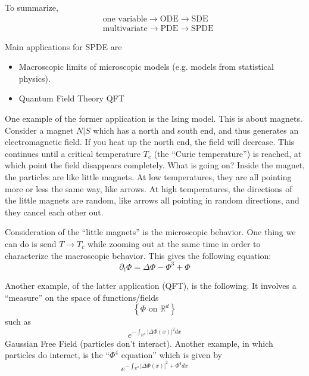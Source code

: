 \documentclass{article}
\def\R{\mathbb{R}} %
\begin{document}
To summarize,
\begin{align*}
  &\text{one variable}\rightarrow \text{ODE}\rightarrow \text{SDE}\\
  &\text{multivariate}\rightarrow \text{PDE}\rightarrow \text{SPDE} 
\end{align*}

Main applications for SPDE are
\begin{itemize}
  \item Macroscopic limits of microscopic models (e.g. models from statistical
  physics). 
  \item Quantum Field Theory QFT
\end{itemize}

One example of the former application is the Ising model. This is about magnets.
Consider a magnet $N|S$ which has a north and south end, and thus generates an
electromagnetic field. If you heat up the north end, the field will decrease.
This continues until a critical temperature $T_{c}$ (the ``Curie temperature'')
is reached, at which point the field disappears completely. What is going on?
Inside the magnet, the particles are like little magnets. At low temperatures,
they are all pointing more or less the same way, like arrows. At high
temperatures, the directions of the little magnets are random, like arrows all
pointing in random directions, and they cancel each other out.

Consideration of the ``little magnets'' is the microscopic behavior. One thing
we can do is send $T \to T_{c}$ while zooming out at the same time in order to
characterize the macroscopic behavior. This gives the following equation:
\begin{equation*}
  \partial_{t}\Phi = \Delta \Phi - \Phi^{3}+ \Phi
\end{equation*}


Another example, of the latter application (QFT), is the following. It involves
a ``measure'' on the space of functions/fields
\begin{equation*}
  \left\{\Phi \text{ on } \R^d \right\}
\end{equation*}
such as
\begin{equation*}
  e^{-\int_{\R^d }|\Delta \Phi(x)|^{2}dx }
\end{equation*}
Gaussian Free Field (particles don't interact). Another example, in which
particles do interact, is the ``$\Phi^{4}$ equation'' which is given by 
\begin{equation*}
  e^{-\int_{\R^d }|\Delta \Phi(x)|^{2} +\Phi^{4}dx }
\end{equation*}
\end{document}
